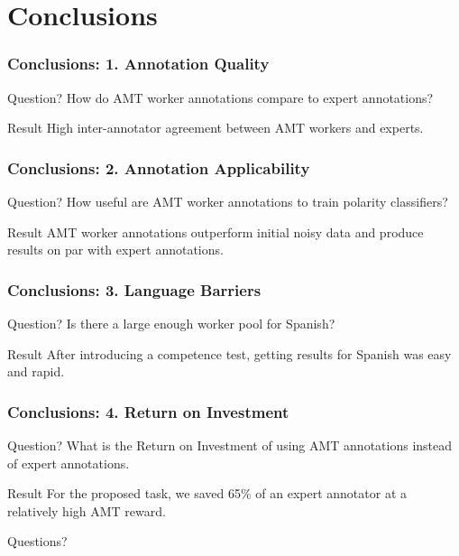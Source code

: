\documentclass[10pt]{beamer}
\begin{document}
\section{Conclusions}

\begin{frame}
  \frametitle{Conclusions: 1. Annotation Quality}
\begin{block}{Question?}
How do AMT worker annotations compare to expert annotations?
\end{block}
\begin{block}{Result}
High inter-annotator agreement between AMT workers and experts. %
\end{block}
\end{frame}

\begin{frame}
  \frametitle{Conclusions: 2. Annotation Applicability}
\begin{block}{Question?}
How useful are AMT worker annotations to train polarity classifiers?
\end{block}
\begin{block}{Result}
AMT worker annotations outperform initial noisy data and produce results on par with expert annotations.
\end{block}
\end{frame}

\begin{frame}
  \frametitle{Conclusions: 3. Language Barriers}
\begin{block}{Question?}
Is there a large enough worker pool for Spanish?
\end{block}
\begin{block}{Result}
After introducing a competence test, getting results for Spanish was easy and rapid.
\end{block}
\end{frame}

\begin{frame}
  \frametitle{Conclusions: 4. Return on Investment}
\begin{block}{Question?}
What is the Return on Investment of using AMT annotations instead of expert annotations.
\end{block}
\begin{block}{Result}
For the proposed task, we saved 65\% of an expert annotator at a relatively high AMT reward.
\end{block}
\end{frame}

\begin{frame}
\vspace{3cm}
\begin{center}
  \begin{Large}Questions?\end{Large}
\end{center}
\vspace{2.3cm}\hspace{8.5cm}
\end{frame}
\end{document}
